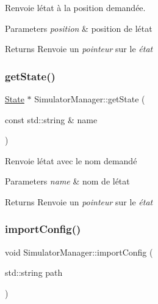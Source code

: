 Renvoie l\textquotesingle{}état à la position demandée. 


\begin{DoxyParams}{Parameters}
{\em position} & position de l\textquotesingle{}état \\
\hline
\end{DoxyParams}
\begin{DoxyReturn}{Returns}
Renvoie un {\itshape pointeur} sur le {\itshape état} 
\end{DoxyReturn}
\mbox{\label{class_simulator_manager_aa2158ff5323a4d4748b548175e5db148}} 
\subsubsection{\texorpdfstring{get\+State()}{getState()}\hspace{0.1cm}{\footnotesize\ttfamily [2/2]}}
{\footnotesize\ttfamily \mbox{\hyperlink{class_state}{State}} $\ast$ Simulator\+Manager\+::get\+State (\begin{DoxyParamCaption}\item[{const std\+::string \&}]{name }\end{DoxyParamCaption})}



Renvoie l\textquotesingle{}état avec le nom demandé 


\begin{DoxyParams}{Parameters}
{\em name} & nom de l\textquotesingle{}état \\
\hline
\end{DoxyParams}
\begin{DoxyReturn}{Returns}
Renvoie un {\itshape pointeur} sur le {\itshape état} 
\end{DoxyReturn}
\mbox{\label{class_simulator_manager_a1585f10ac98e7e57c47bead4c096c8e0}} 
\subsubsection{\texorpdfstring{import\+Config()}{importConfig()}}
{\footnotesize\ttfamily void Simulator\+Manager\+::import\+Config (\begin{DoxyParamCaption}\item[{std\+::string}]{path }\end{DoxyParamCaption})}



